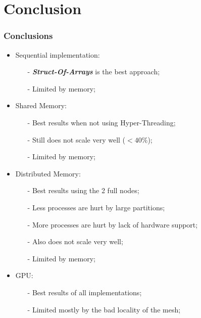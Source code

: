\section{Conclusion}

\begin{frame}
	\frametitle{Conclusions}

	\begin{itemize}
		\item Sequential implementation:
		\begin{itemize}
			\item[-] \textbf{\itshape Struct-Of-Arrays} is the best approach;
			\item[-] Limited by memory;
		\end{itemize}
		\item Shared Memory:
		\begin{itemize}
			\item[-] Best results when not using Hyper-Threading;
			\item[-] Still does not scale very well ($<40\%$);
			\item[-] Limited by memory;
		\end{itemize}
		\item Distributed Memory:
		\begin{itemize}
			\item[-] Best results using the 2 full nodes;
			\item[-] Less processes are hurt by large partitions;
			\item[-] More processes are hurt by lack of hardware support;
			\item[-] Also does not scale very well;
			\item[-] Limited by memory;
		\end{itemize}
		\item GPU:
		\begin{itemize}
			\item[-] Best results of all implementations;
			\item[-] Limited mostly by the bad locality of the mesh;
		\end{itemize}
	\end{itemize}
\end{frame}

